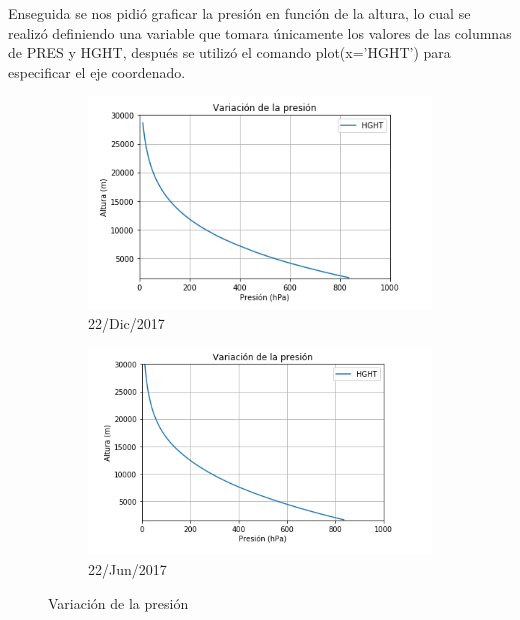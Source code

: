 \documentclass{article}
\begin{document}
Enseguida se nos pidió graficar la presión en función de la altura, lo cual se realizó definiendo una variable que tomara únicamente los valores de las columnas de PRES y HGHT, después se utilizó el comando plot(x='HGHT') para especificar el eje coordenado.
\begin{figure}[h!]
	\begin{subfigure}[b]{0.5\linewidth}
    \raggedleft
	\includegraphics[width=\linewidth]{3rdInst.png}
    \caption{22/Dic/2017}
	\end{subfigure}
	\begin{subfigure}[b]{0.5\linewidth}
    \raggedright
	\includegraphics[width=\linewidth]{3rdInstJun.png}
	\caption{22/Jun/2017}
    \end{subfigure}
    \caption{Variación de la presión}
\end{figure}
\end{document}
